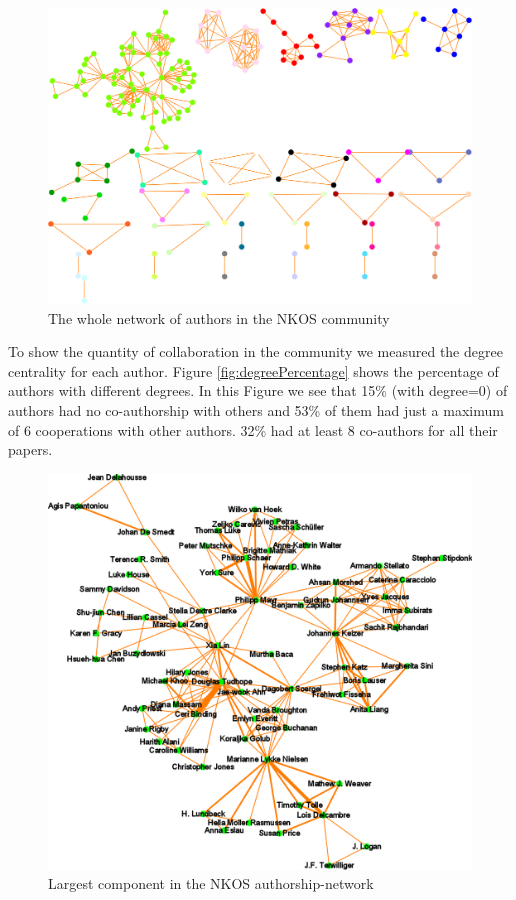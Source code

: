 \documentclass[runningheads,a4paper]{llncs}
\begin{document}
\begin{figure}[H]
	\centering
	\includegraphics[width=1.0\linewidth]{wholeNet}
	\vspace{-0.5em}
	\caption{The whole network of authors in the NKOS community}
	\label{fig:wholenet}
	\vspace{-0.5em}
\end{figure}
To show the quantity of collaboration in the community we measured the degree centrality for each author. Figure \ref{fig:degreePercentage} shows the percentage of authors with different degrees. In this Figure we see that 15\% (with degree=0) of authors had no co-authorship with others and 53\% of them had just a maximum of 6 cooperations with other authors. 32\% had at least 8 co-authors for all their papers.

\begin{figure}[H]
	\centering
	\includegraphics[width=0.9\linewidth]{largestComponent}
	\caption{Largest component in the NKOS authorship-network}
	\label{fig:largestComponent}
\end{figure}
\end{document}

